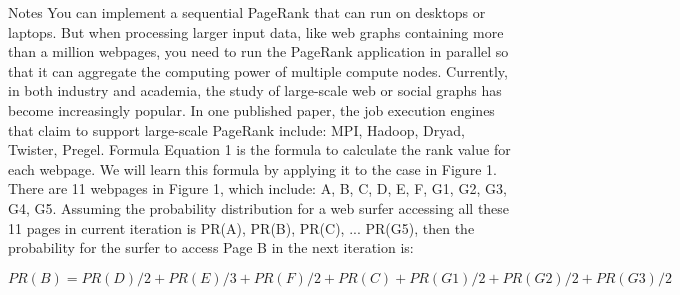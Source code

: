 Notes
You can implement a sequential PageRank that can run on desktops or laptops. But when processing
larger input data, like web graphs containing more than a million webpages, you need to run the PageRank
application in parallel so that it can aggregate the computing power of multiple compute nodes. Currently, in
both industry and academia, the study of large-scale web or social graphs has become increasingly popular.
In one published paper, the job execution engines that claim to support large-scale PageRank include: MPI,
Hadoop, Dryad, Twister, Pregel.
Formula
Equation 1 is the formula to calculate the rank value for each webpage. We will learn this formula by
applying it to the case in Figure 1. There are 11 webpages in Figure 1, which include: A, B, C, D, E, F,
G1, G2, G3, G4, G5. Assuming the probability distribution for a web surfer accessing all these 11 pages in
current iteration is {PR(A), PR(B), PR(C), ... PR(G5)}, then the probability for the surfer to access Page
B in the next iteration is:

\[ PR(B) = P R(D)/2 + P R(E)/3 + P R(F)/2 + P R(C) + P R(G1)/2 + P R(G2)/2 + P R(G3)/2\]


